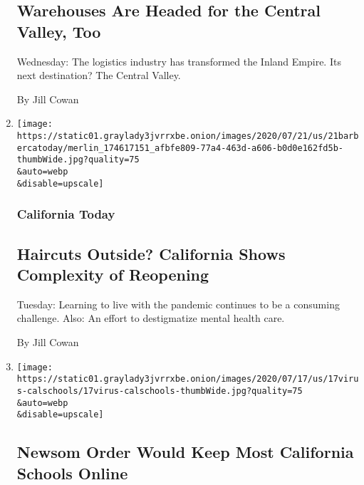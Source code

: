 \begin{enumerate}
  \hypertarget{warehouses-are-headed-for-the-central-valley-too}{%
  \subsection{Warehouses Are Headed for the Central Valley,
  Too}\label{warehouses-are-headed-for-the-central-valley-too}}

  Wednesday: The logistics industry has transformed the Inland Empire.
  Its next destination? The Central Valley.

  By Jill Cowan
\item
  \href{/2020/07/21/us/california-coronavirus-cases.html}{}

  \texttt{[image: https://static01.graylady3jvrrxbe.onion/images/2020/07/21/us/21barbercatoday/merlin\_174617151\_afbfe809-77a4-463d-a606-b0d0e162fd5b-thumbWide.jpg?quality=75\\\&auto=webp\\\&disable=upscale]}

  \hypertarget{california-today-6}{%
  \subsubsection{California Today}\label{california-today-6}}

  \hypertarget{haircuts-outside-california-shows-complexity-of-reopening}{%
  \subsection{Haircuts Outside? California Shows Complexity of
  Reopening}\label{haircuts-outside-california-shows-complexity-of-reopening}}

  Tuesday: Learning to live with the pandemic continues to be a
  consuming challenge. Also: An effort to destigmatize mental health
  care.

  By Jill Cowan
\item
  \href{/2020/07/17/us/california-schools-reopening-newsom.html}{}

  \texttt{[image: https://static01.graylady3jvrrxbe.onion/images/2020/07/17/us/17virus-calschools/17virus-calschools-thumbWide.jpg?quality=75\\\&auto=webp\\\&disable=upscale]}

  \hypertarget{newsom-order-would-keep-most-california-schools-online}{%
  \subsection{Newsom Order Would Keep Most California Schools
  Online}\label{newsom-order-would-keep-most-california-schools-online}}


\end{enumerate}
